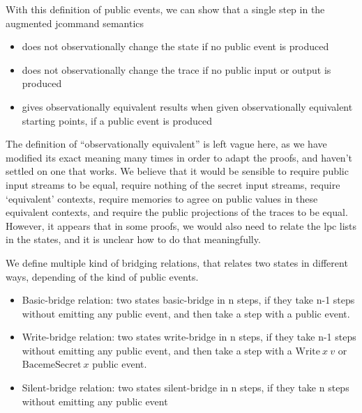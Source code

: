 \documentclass[10pt]{article}
\newcommand{\lpc}{\mathrm{lpc}}
\begin{document}
With this definition of public events, we can show that a single step in the augmented jcommand semantics
\begin{itemize}
\item does not observationally change the state if no public event is produced
\item does not observationally change the trace if no public input or output is produced
\item gives observationally equivalent results when given observationally equivalent starting points, if a public event is produced
\end{itemize}

The definition of ``observationally equivalent'' is left vague here, as we have modified its exact meaning many times in order to adapt the proofs, and haven't settled on one that works. We believe that it would be sensible to require public input streams to be equal, require nothing of the secret input streams, require `equivalent' contexts, require memories to agree on public values in these equivalent contexts, and require the public projections of the traces to be equal. However, it appears that in some proofs, we would also need to relate the \( \lpc \) lists in the states, and it is unclear how to do that meaningfully.


We define multiple kind of bridging relations, that relates two states in different ways, depending
of the kind of public events.

\begin{itemize}
  \item Basic-bridge relation: %
        two states basic-bridge in n steps, if they take n-1 steps without emitting any public
        event, and then take a step with a public event.
  \item Write-bridge relation: %
        two states write-bridge in n steps, if they take n-1 steps without emitting any public
        event, and then take a step with a \( \mathrm{Write}~x~v \) or \( \mathrm{BacemeSecret}~x \) public event.
  \item Silent-bridge relation: %
    two states silent-bridge in n steps, if they take n steps without emitting any public event
\end{itemize}
\end{document}
